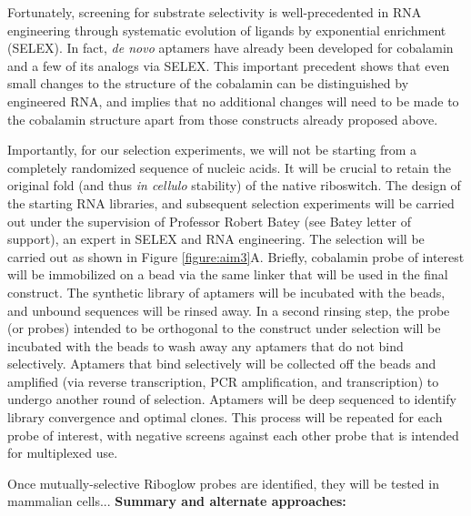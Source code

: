 Fortunately, screening for substrate selectivity is well-precedented in RNA engineering through systematic evolution of ligands by exponential enrichment (SELEX).\cite{MairalAptamersmoleculartools2008,ChoApplicationsAptamersSensors2009} In fact, \textit{de novo} aptamers have already been developed for cobalamin and a few of its analogs via SELEX.\cite{LorschvitroselectionRNA1994} This important precedent shows that even small changes to the structure of the cobalamin can be distinguished by engineered RNA, and implies that no additional changes will need to be made to the cobalamin structure apart from those constructs already proposed above.

Importantly, for our selection experiments, we will not be starting from a completely randomized sequence of nucleic acids. It will be crucial to retain the original fold (and thus \textit{in cellulo} stability) of the native riboswitch. The design of the starting RNA libraries, and subsequent selection experiments will be carried out under the supervision of Professor Robert Batey (see Batey letter of support), an expert in SELEX and RNA engineering.\cite{TrauschChapterThreeDesign2015} The selection will be carried out as shown in Figure \ref{figure:aim3}A. Briefly, cobalamin probe of interest will be immobilized on a bead via the same linker that will be used in the final construct. The synthetic library of aptamers will be incubated with the beads, and unbound sequences will be rinsed away. In a second rinsing step, the probe (or probes) intended to be orthogonal to the construct under selection will be incubated with the beads to wash away any aptamers that do not bind selectively.  Aptamers that bind selectively will be collected off the beads and amplified (via reverse transcription, PCR amplification, and transcription) to undergo another round of selection. Aptamers will be deep sequenced to identify library convergence and optimal clones. This process will be repeated for each probe of interest, with negative screens against each other probe that is intended for multiplexed use.

Once mutually-selective Riboglow probes are identified, they will be tested in mammalian cells... 
\textbf{Summary and alternate approaches:}

